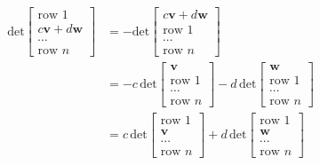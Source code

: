 \documentclass{report}
\begin{document}
\begin{align*}
\text{det}\left[\begin{array}{c}
\text{row 1}\\c\bm v+d\bm w\\\cdots\\\text{row $n$}
\end{array}\right]&=
-\text{det}\left[\begin{array}{c}
c\bm v+d\bm w\\\text{row 1}\\\cdots\\\text{row $n$}
\end{array}\right]\\
&=-c\,\text{det}\left[\begin{array}{c}
\bm v\\\text{row 1}\\\cdots\\\text{row $n$}
\end{array}\right]-
d\,\text{det}\left[\begin{array}{c}
\bm w\\\text{row 1}\\\cdots\\\text{row $n$}
\end{array}\right]\\
&=c\,\text{det}\left[\begin{array}{c}
\text{row 1}\\\bm v\\\cdots\\\text{row $n$}
\end{array}\right]+
d\,\text{det}\left[\begin{array}{c}
\text{row 1}\\\bm w\\\cdots\\\text{row $n$}
\end{array}\right]
\end{align*}
\end{document}
